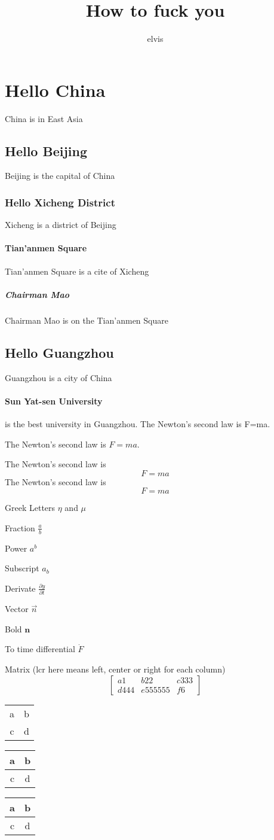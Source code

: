 \documentclass{article}
\author{elvis}
\title{How to fuck you}
\begin{document}
\maketitle
\tableofcontents
\section{Hello China} China is in East Asia
\subsection{Hello Beijing} Beijing is the capital of China
\subsubsection{Hello Xicheng District} Xicheng is a district of Beijing
\paragraph{Tian'anmen Square} Tian'anmen Square is a cite of Xicheng
\subparagraph{Chairman Mao} Chairman Mao is on the Tian'anmen Square
\subsection{Hello Guangzhou} Guangzhou is a city of China
\paragraph{Sun Yat-sen University} is the best university in Guangzhou.
The Newton's second law is F=ma.

The Newton's second law is $F=ma$.

The Newton's second law is $$F=ma$$
The Newton's second law is
\[F=ma\]

Greek Letters $\eta$ and $\mu$

Fraction $\frac{a}{b}$

Power $a^b$

Subscript $a_b$

Derivate $\frac{\partial y}{\partial t} $

Vector $\vec{n}$

Bold $\mathbf{n}$

To time differential $\dot{F}$

Matrix (lcr here means left, center or right for each column)
\[
\left[
\begin{array}{lcr}
a1 & b22 & c333 \\
d444 & e555555 & f6
\end{array}
\right]
\]

\begin{tabular}{|c|c|}
	a & b \\
	c & d\\
\end{tabular}

\begin{tabular}{|c|c|}
	\hline
	a & b \\
	\hline
	c & d\\
	\hline
\end{tabular}

\begin{center}
	\begin{tabular}{|c|c|}
		\hline
		a & b \\ \hline
		c & d\\
		\hline
	\end{tabular}
\end{center}
\end{document}
